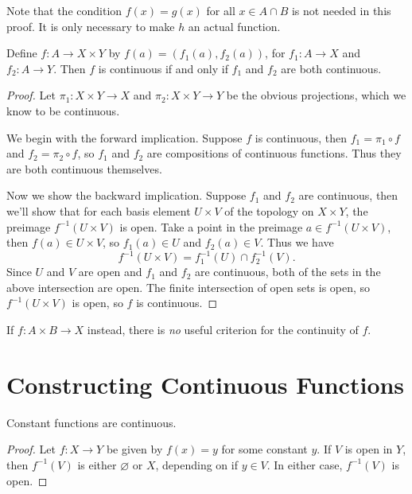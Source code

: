 \documentclass[10pt]{report}
\begin{document}
	Note that the condition $f(x) = g(x)$ for all $x \in A \cap B$ is not needed in this proof. It is only necessary to make $h$ an actual function.

\begin{thrm}
	Define $f:A\to X \times Y$ by $f(a)=(f_1(a), f_2(a))$, for $f_1:A\to X$ and $f_2:A\to Y$. Then $f$ is continuous if and only if $f_1$ and $f_2$ are both continuous.
\end{thrm}
\begin{proof}
	Let $\pi_1:X\times Y\to X$ and $\pi_2:X\times Y\to Y$ be the obvious projections, which we know to be continuous.

	We begin with the forward implication. Suppose $f$ is continuous, then $f_1=\pi_1 \circ f$ and $f_2=\pi_2 \circ f$, so $f_1$ and $f_2$ are compositions of continuous functions. Thus they are both continuous themselves.

	Now we show the backward implication. Suppose $f_1$ and $f_2$ are continuous, then we'll show that for each basis element $U \times V$ of the topology on $X \times Y$, the preimage $f^{-1}(U \times V)$ is open. Take a point in the preimage $a \in f^{-1}(U \times V)$, then $f(a) \in U \times V$, so $f_1(a) \in U$ and $f_2(a) \in V$. Thus we have
	\[
		f^{-1}(U \times V) = f_1^{-1}(U) \cap f_2^{-1}(V).
	\] Since $U$ and $V$ are open and $f_1$ and $f_2$ are continuous, both of the sets in the above intersection are open. The finite intersection of open sets is open, so $f^{-1}(U\times V)$ is open, so $f$ is continuous.
\end{proof}

\begin{note}
	If $f:A\times B\to X$ instead, there is \textit{no} useful criterion for the continuity of $f$.
\end{note}


\section{Constructing Continuous Functions}

\begin{prop}
Constant functions are continuous.
\end{prop}
\begin{proof}
	Let $f:X\to Y$ be given by $f(x)=y$ for some constant $y$. If $V$ is open in $Y$, then $f^{-1}(V)$ is either $\varnothing$ or $X$, depending on if $y \in V$. In either case, $f^{-1}(V)$ is open.
\end{proof}
\end{document}
